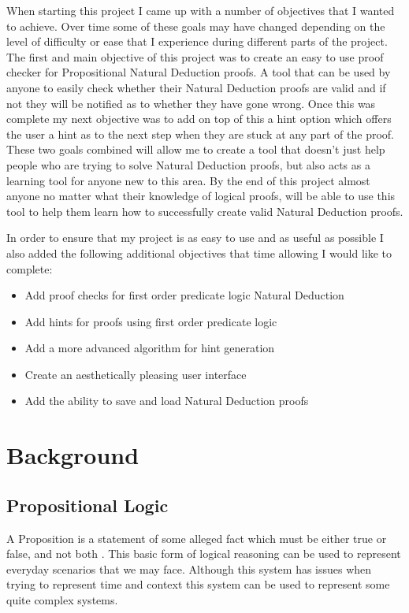 When starting this project I came up with a number of objectives that I wanted to achieve. Over time some of these goals may have changed depending on the level of difficulty or ease that I experience during different parts of the project. The first and main objective of this project was to create an easy to use proof checker for Propositional Natural Deduction proofs. A tool that can be used by anyone to easily check whether their Natural Deduction proofs are valid and if not they will be notified as to whether they have gone wrong. Once this was complete my next objective was to add on top of this a hint option which offers the user a hint as to the next step when they are stuck at any part of the proof. These two goals combined will allow me to create a tool that doesn't just help people who are trying to solve Natural Deduction proofs, but also acts as a learning tool for anyone new to this area. By the end of this project almost anyone no matter what their knowledge of logical proofs, will be able to use this tool to help them learn how to successfully create valid Natural Deduction proofs.

In order to ensure that my project is as easy to use and as useful as possible I also added the following additional objectives that time allowing I would like to complete:
\begin{itemize}
\item Add proof checks for first order predicate logic Natural Deduction
\item Add hints for proofs using first order predicate logic
\item Add a more advanced algorithm for hint generation
\item Create an aesthetically pleasing user interface
\item Add the ability to save and load Natural Deduction proofs
\end{itemize}

\section{Background \label{Background}}

\subsection{Propositional Logic}

A Proposition is a statement of some alleged fact which must be either true or false, and not both \cite{ndBook}. This basic form of logical reasoning can be used to represent everyday scenarios that we may face. Although this system has issues when trying to represent time and context this system can be used to represent some quite complex systems.

